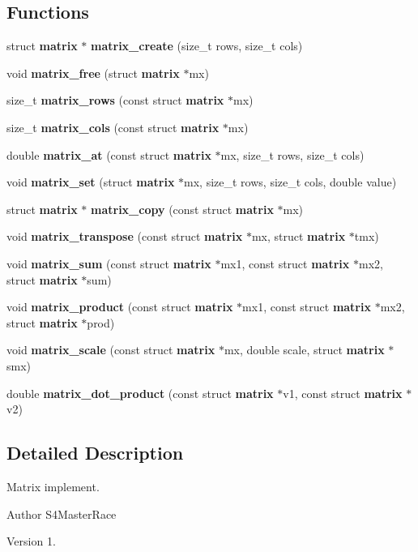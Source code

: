 \subsection*{Functions}
\begin{DoxyCompactItemize}
\item 
struct \textbf{ matrix} $\ast$ \textbf{ matrix\+\_\+create} (size\+\_\+t rows, size\+\_\+t cols)
\item 
void \textbf{ matrix\+\_\+free} (struct \textbf{ matrix} $\ast$mx)
\item 
size\+\_\+t \textbf{ matrix\+\_\+rows} (const struct \textbf{ matrix} $\ast$mx)
\item 
size\+\_\+t \textbf{ matrix\+\_\+cols} (const struct \textbf{ matrix} $\ast$mx)
\item 
double \textbf{ matrix\+\_\+at} (const struct \textbf{ matrix} $\ast$mx, size\+\_\+t rows, size\+\_\+t cols)
\item 
void \textbf{ matrix\+\_\+set} (struct \textbf{ matrix} $\ast$mx, size\+\_\+t rows, size\+\_\+t cols, double value)
\item 
struct \textbf{ matrix} $\ast$ \textbf{ matrix\+\_\+copy} (const struct \textbf{ matrix} $\ast$mx)
\item 
void \textbf{ matrix\+\_\+transpose} (const struct \textbf{ matrix} $\ast$mx, struct \textbf{ matrix} $\ast$tmx)
\item 
void \textbf{ matrix\+\_\+sum} (const struct \textbf{ matrix} $\ast$mx1, const struct \textbf{ matrix} $\ast$mx2, struct \textbf{ matrix} $\ast$sum)
\item 
void \textbf{ matrix\+\_\+product} (const struct \textbf{ matrix} $\ast$mx1, const struct \textbf{ matrix} $\ast$mx2, struct \textbf{ matrix} $\ast$prod)
\item 
void \textbf{ matrix\+\_\+scale} (const struct \textbf{ matrix} $\ast$mx, double scale, struct \textbf{ matrix} $\ast$smx)
\item 
double \textbf{ matrix\+\_\+dot\+\_\+product} (const struct \textbf{ matrix} $\ast$v1, const struct \textbf{ matrix} $\ast$v2)
\end{DoxyCompactItemize}


\subsection{Detailed Description}
Matrix implement. 

\begin{DoxyAuthor}{Author}
S4\+Master\+Race 
\end{DoxyAuthor}
\begin{DoxyVersion}{Version}
1. 
\end{DoxyVersion}


